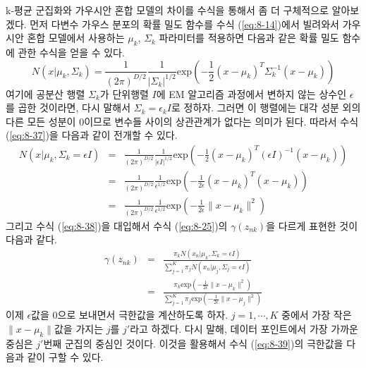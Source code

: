 \documentclass[a4paper]{oblivoir}
\begin{document}
k-평균 군집화와 가우시안 혼합 모델의 차이를 수식을 통해서 좀 더 구체적으로 알아보겠다. 먼저 다변수 가우스 분포의 확률 밀도 함수를 수식 (\ref{eq:8-14})에서 빌려와서 가우시안 혼합 모델에서 사용하는 ${\mu}_{k}$, ${\Sigma}_{k}$ 파라미터를 적용하면 다음과 같은 확률 밀도 함수에 관한 수식을 얻을 수 있다. 
\begin{equation}
N(x| {\mu}_{k},  {\Sigma}_{k}) = \frac{1}{(2 \pi)^{D/2}} \frac{1}{| {\Sigma}_{k} |^{1/2}} \textrm{exp}(-\frac{1}{2} ( {x}- {\mu}_{k})^{T}  {\Sigma}_{k}^{-1} ( {x}- {\mu}_{k})) \label{eq:8-37} 
\end{equation}
여기에 공분산 행렬 ${\Sigma}_{k}$가 단위행렬 $I$에 EM 알고리즘 과정에서 변하지 않는 상수인 $\epsilon$를 곱한 것이라면, 다시 말해서 ${\Sigma}_{k}=\epsilon_{k}I$로 정하자. 그러면 이 행렬에는 대각 성분 외의 다른 모든 성분이 0이므로 변수들 사이의 상관관계가 없다는 의미가 된다. 따라서 수식 (\ref{eq:8-37})을 다음과 같이 전개할 수 있다. 
\begin{eqnarray}
N(x| {\mu}_{k},  {\Sigma}_{k} = \epsilon I) & = & \frac{1}{(2 \pi)^{D/2}} \frac{1}{| \epsilon I |^{1/2}} \textrm{exp}(-\frac{1}{2} ( {x}- {\mu}_{k})^{T}  (\epsilon I)^{-1} ( {x}- {\mu}_{k}))  \nonumber  \\
& = & \frac{1}{(2 \pi)^{D/2}} \frac{1}{\epsilon^{1/2}} \textrm{exp}(-\frac{1}{2\epsilon} ( {x}- {\mu}_{k})^{T}( {x}- {\mu}_{k}))  \nonumber  \\
& = & \frac{1}{(2 \pi)^{D/2}} \frac{1}{\epsilon^{1/2}} \textrm{exp}(-\frac{1}{2\epsilon} \lVert {x}- {\mu}_{k} \rVert^2) \label{eq:8-38} 
\end{eqnarray}
그리고 수식 (\ref{eq:8-38})을 대입해서 수식 (\ref{eq:8-25})의 $\gamma(z_{nk})$을 다르게 표현한 것이 다음과 같다.  
\begin{eqnarray}
\gamma(z_{nk}) & = & \frac{ \pi_{k} N(x_{n}|{\mu}_{k}, {\Sigma}_{k} = \epsilon I ) }{ \sum_{j=1}^{K} \pi_{j} N(x_{n}|{\mu}_{j}, {\Sigma}_{j} = \epsilon I ) } \nonumber  \\
& = & \frac{ \pi_{k} \textrm{exp}(-\frac{1}{2\epsilon} \lVert {x}- {\mu}_{k} \rVert^2) }{ \sum_{j=1}^{K} \pi_{j} \textrm{exp}(-\frac{1}{2\epsilon} \lVert {x}- {\mu}_{j} \rVert^2) } \label{eq:8-39} 
\end{eqnarray}
이제 $\epsilon$값을 0으로 보내면서 극한값을 계산하도록 하자. $j=1,\cdots,K$ 중에서 가장 작은 $\lVert {x}- {\mu}_{k} \rVert$값을 가지는 $j$를 $j'$라고 하겠다. 다시 말해, 데이터 포인트에서 가장 가까운 중심은 $j'$번째 군집의 중심인 것이다. 이것을 활용해서 수식 (\ref{eq:8-39})의 극한값을 다음과 같이 구할 수 있다. 
\end{document}
